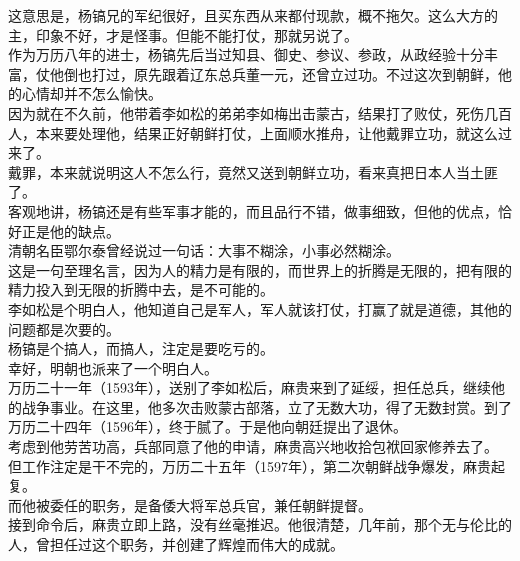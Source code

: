 \begin{multicols}{\theparacolNo}
这意思是，杨镐兄的军纪很好，且买东西从来都付现款，概不拖欠。这么大方的主，印象不好，才是怪事。但能不能打仗，那就另说了。\\

作为万历八年的进士，杨镐先后当过知县、御史、参议、参政，从政经验十分丰富，仗他倒也打过，原先跟着辽东总兵董一元，还曾立过功。不过这次到朝鲜，他的心情却并不怎么愉快。\\

因为就在不久前，他带着李如松的弟弟李如梅出击蒙古，结果打了败仗，死伤几百人，本来要处理他，结果正好朝鲜打仗，上面顺水推舟，让他戴罪立功，就这么过来了。\\

戴罪，本来就说明这人不怎么行，竟然又送到朝鲜立功，看来真把日本人当土匪了。\\

客观地讲，杨镐还是有些军事才能的，而且品行不错，做事细致，但他的优点，恰好正是他的缺点。\\

清朝名臣鄂尔泰曾经说过一句话：大事不糊涂，小事必然糊涂。\\

这是一句至理名言，因为人的精力是有限的，而世界上的折腾是无限的，把有限的精力投入到无限的折腾中去，是不可能的。\\

李如松是个明白人，他知道自己是军人，军人就该打仗，打赢了就是道德，其他的问题都是次要的。\\

杨镐是个搞人，而搞人，注定是要吃亏的。\\

幸好，明朝也派来了一个明白人。\\

万历二十一年（1593年），送别了李如松后，麻贵来到了延绥，担任总兵，继续他的战争事业。在这里，他多次击败蒙古部落，立了无数大功，得了无数封赏。到了万历二十四年（1596年），终于腻了。于是他向朝廷提出了退休。\\

考虑到他劳苦功高，兵部同意了他的申请，麻贵高兴地收拾包袱回家修养去了。\\

但工作注定是干不完的，万历二十五年（1597年），第二次朝鲜战争爆发，麻贵起复。\\

而他被委任的职务，是备倭大将军总兵官，兼任朝鲜提督。\\

接到命令后，麻贵立即上路，没有丝毫推迟。他很清楚，几年前，那个无与伦比的人，曾担任过这个职务，并创建了辉煌而伟大的成就。\\


\end{multicols}
